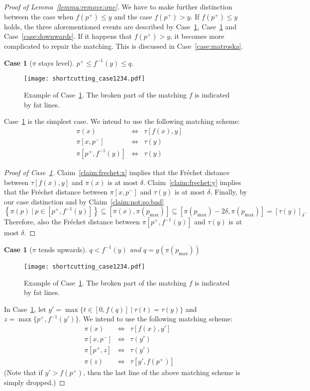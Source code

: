\documentclass[11pt, letter]{article}
\newtheorem{case}[]{Case}
\newcommand{\lemref}[1]{Lemma~\ref{lemma:#1}}
\newcommand{\figlab}[1]{\label{fig:#1}}
\newcommand{\caselab}[1]{\label{case:#1}}
\newcommand{\caseref}[1]{Case~\ref{case:#1}}
\newcommand{\claimref}[1]{Claim~\ref{claim:#1}}
\newcommand{\Frechet}{Fr\'echet\xspace}
\providecommand{\brc}[1]{\left\{ {#1} \right\}}
\newcommand{\setSubC}[4]{\ensuremath{\brc{ #1(#2) ~|~ #2 \in [#3,#4]} }}
\newcommand{\range}[2]{\ensuremath{[#1]_{#2}}}
\begin{document}
\begin{proof}[Proof of \lemref{remove:one}]
We have to make further distinction between the case when $f(p^{+}) \leq y$ and the case $f(p^{+}) > y$. If $f(p^{+}) \leq y$ holds, the three aforementioned events are described by \caseref{level}, \caseref{upwards} and \caseref{downwards}. If it happens that $f(p^{+}) > y$, it becomes more complicated to repair the matching. This is discussed in \caseref{matroska}.


\begin{case}[$\pi$ stays level]
$p^{+} \leq f^{-1}(y) \leq q$.
\caselab{level}
\end{case}
\begin{figure}[h]\centering
\texttt{[image: shortcutting\_case1234.pdf]}\\
\caption{Example of \caseref{level}. The broken part of the matching $f$ is indicated by fat lines.}
\figlab{shortcutting:case2}
\end{figure}
\caseref{level} is the simplest case. We intend to use the following matching scheme:
\begin{eqnarray*}
\pi(x) &\Leftrightarrow& \tau[f(x),y]\\
\pi[x,p^{-}] &\Leftrightarrow& \tau(y)\\
\pi[p^{+},f^{-1}(y)] &\Leftrightarrow& \tau(y)
\end{eqnarray*}

\begin{proof}[Proof of \caseref{level}]
\claimref{frechet:x} implies that the \Frechet distance between $\tau[f(x),y]$
and $\pi(x)$ is at most $\delta$.
\claimref{frechet:y} implies that the \Frechet distance between $\pi[x,p^{-}]$
and $\tau(y)$ is at most $\delta$.
Finally, by our case distinction and by \claimref{not:so:bad}
\[\setSubC{\pi}{p}{p^{+}}{f^{-1}(y)} 
\subseteq [\pi(x), \pi(p_{\max})] 
\subseteq [\pi(p_{\max})-2\delta, \pi(p_{\max})] 
= \range{\tau(y)}{\delta}.\]
Therefore, also the \Frechet distance between $\pi[p^{+},f^{-1}(y)]$ and $\tau(y)$ is at most
$\delta$.
\end{proof}

\begin{case}[$\pi$ tends upwards]
$q < f^{-1}(y)$ and $q=g(\pi(p_{\max}))$
\caselab{upwards}
\end{case}
\begin{figure}[h]\centering
\texttt{[image: shortcutting\_case1234.pdf]}\\
\caption{Example of \caseref{upwards}. The broken part of the matching $f$ is indicated by fat lines.}
\figlab{shortcutting:case3}
\end{figure}
 In \caseref{upwards}, let $y'=\max\{t\in [0,f(q)]~ |~
 \tau(t)=\tau(y) \}$ and $z=\max\{p^{+},f^{-1}(y')\}$. We intend to use
 the following matching scheme:
\begin{eqnarray*}
\pi(x) &\Leftrightarrow& \tau[f(x),y']\\
\pi[x,p^{-}] &\Leftrightarrow& \tau(y')\\
\pi[p^{+},z] &\Leftrightarrow& \tau(y')\\
\pi(z) &\Leftrightarrow& \tau[y',f(p^{+})]
\end{eqnarray*}
(Note that if $y' > f(p^{+})$, then the last line of the above matching scheme is simply dropped.) 


\end{proof}
\end{document}
